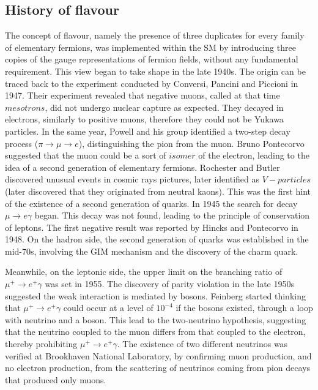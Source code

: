 \subsection{History of flavour}
The concept of flavour, namely the presence of three 
duplicates for every family of elementary fermions, was implemented within the SM by introducing 
three copies of the gauge representations of fermion fields, without any fundamental requirement. This view began 
to take shape in the late 1940s. The origin can be traced back to the 
experiment conducted by Conversi, Pancini and Piccioni in 1947. Their experiment 
revealed that negative muons, called at that time $mesotrons$, did not 
undergo nuclear capture as expected. They decayed in electrons, similarly to positive muons, 
therefore they could not be Yukawa particles. In the same year, 
Powell and his group identified a two-step decay process ($\pi \rightarrow \mu \rightarrow e$), 
distinguishing the pion from the muon. Bruno Pontecorvo suggested 
that the muon could be a sort of $isomer$ of the electron, leading to the idea of a second 
generation of elementary fermions. Rochester and Butler discovered 
unusual events in cosmic rays pictures, later identified as 
$V-particles$ (later discovered that they originated from neutral kaons). This was 
the first hint of the existence of a second generation of quarks. 
In 1945 the search for decay $\mu \rightarrow e \gamma$ began. This decay was not found, 
leading to the principle of conservation of leptons. The first negative 
result was reported by Hincks and Pontecorvo in 1948. 
On the hadron side, the second generation of quarks was established in the mid-70s, 
involving the GIM mechanism and the discovery of the charm quark.

Meanwhile, on the leptonic side, the upper limit on the 
branching ratio of $\mu^+ \rightarrow  e^+ \gamma$ was set in 1955. The discovery of parity violation 
in the late 1950s suggested the weak interaction is 
mediated by bosons. Feinberg started thinking that $\mu^+ \rightarrow  e^+ \gamma$ could occur 
at a level of $10^{-4}$ if the bosons existed, through a 
loop with neutrino and a boson. This lead to the two-neutrino hypothesis, suggesting that 
the neutrino coupled to the muon differs from that coupled to 
the electron, thereby prohibiting $\mu^+ \rightarrow  e^+ \gamma$. The existence of 
two different neutrinos was verified at Brookhaven National Laboratory, by
confirming muon production, and no electron production, from the scattering of neutrinos
coming from pion decays that produced only muons.

